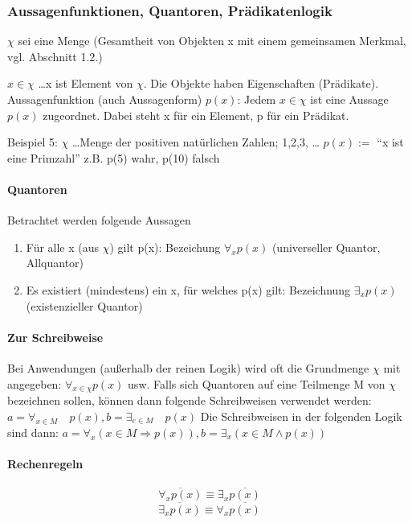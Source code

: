 \documentclass[a4paper]{scrartcl}
\begin{document}
\subsubsection{Aussagenfunktionen, Quantoren, Prädikatenlogik} %

$\chi$ sei eine Menge (Gesamtheit von Objekten x mit einem gemeinsamen Merkmal, vgl. Abschnitt 1.2.)

$x \in \chi$ \dots x ist Element von $\chi$.
Die Objekte haben Eigenschaften (Prädikate).
Aussagenfunktion (auch Aussagenform) $p(x)$:
Jedem $x \in \chi$ ist eine Aussage $p(x)$ zugeordnet.
Dabei steht x für ein Element, p für ein Prädikat.

Beispiel 5:
$\chi$ \dots Menge der positiven natürlichen Zahlen; 1,2,3, \dots
$p(x) :=$ "`x ist eine Primzahl"'
z.B. p(5) wahr, p(10) falsch

\paragraph{Quantoren}
Betrachtet werden folgende Aussagen
\begin{enumerate}
\item Für alle x (aus $\chi$) gilt p(x):
Bezeichung $\forall_x p(x)$ (universeller Quantor, Allquantor)
\item Es existiert (mindestens) ein x, für welches p(x) gilt:
Bezeichnung $\exists_x p(x)$ (existenzieller Quantor)
\end{enumerate}
\paragraph{Zur Schreibweise}
Bei Anwendungen (außerhalb der reinen Logik) wird oft die Grundmenge $\chi$ mit angegeben:
$\forall_{x \in \chi} p(x)$ usw.
Falls sich Quantoren auf eine Teilmenge M von $\chi$ bezeichnen sollen, können dann folgende Schreibweisen verwendet werden:
$a= \forall_{x\in M} \quad p(x), b=\exists_{e\in M} \quad p(x)$
Die Schreibweisen in der folgenden Logik sind dann:
$a=\forall_x (x \in M \Rightarrow p(x)), b = \exists_x (x\in M \wedge p(x))$
\paragraph{Rechenregeln}
\[\overline{\forall_x p(x)} \equiv \exists_x \overline{p(x)}\]
\[\overline{\exists_x p(x)} \equiv \forall_x \overline{p(x)}\]
\end{document}
